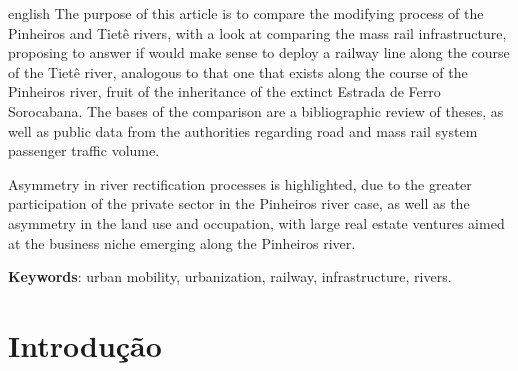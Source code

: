 \documentclass[
article,			%
11pt,				%
oneside,			%
a4paper,			%
english,			%
brazil,				%
sumario=tradicional
]{abntex2}
\begin{document}
	
	\emptythanks
	\maketitle
	
	\renewcommand{\resumoname}{Abstract}
	\begin{resumoumacoluna}
		\begin{otherlanguage*}{english}
			The purpose of this article is to compare the modifying process of the Pinheiros and Tietê rivers, with a look at comparing the mass rail infrastructure, proposing to answer if would make sense to deploy a railway line along the course of the Tietê river, analogous to that one that exists along the course of the Pinheiros river, fruit of the inheritance of the extinct Estrada de Ferro Sorocabana. The bases of the comparison are a bibliographic review of theses, as well as public data from the authorities regarding road and mass rail system passenger traffic volume.
			
			Asymmetry in river rectification processes is highlighted, due to the greater participation of the private sector in the Pinheiros river case, as well as the asymmetry in the land use and occupation, with large real estate ventures aimed at the business niche emerging along the Pinheiros river.
			
			\vspace{\onelineskip}
			
			\noindent
			\textbf{Keywords}: urban mobility, urbanization, railway, infrastructure, rivers.
		\end{otherlanguage*}
	\end{resumoumacoluna}
	
	
	\textual
	\cleardoublepage	%
	
	\section*{Introdução}
	
\end{document}
